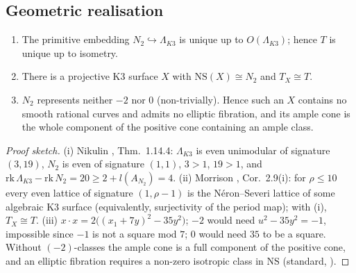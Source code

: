 \subsection{Geometric realisation}\label{sec:rev8geom}
\begin{theorem}\label{thm:K3exist8}
\begin{enumerate}[label=(\roman*)]
\item The primitive embedding $N_2\hookrightarrow\Lambda_{K3}$ is unique up to $O(\Lambda_{K3})$; hence $T$ is unique up to isometry.
\item There is a projective K3 surface $X$ with $\mathrm{NS}(X)\cong N_2$ and $T_X\cong T$.
\item $N_2$ represents neither $-2$ nor $0$ (non-trivially). Hence such an $X$ contains no smooth rational curves and admits no elliptic fibration, and its ample cone is the whole component of the positive cone containing an ample class.
\end{enumerate}
\end{theorem}
\begin{proof}[Proof sketch]
(i) Nikulin \cite{Nikulin}, Thm.~1.14.4: $\Lambda_{K3}$ is even unimodular of signature $(3,19)$, $N_2$ is even of signature $(1,1)$, $3>1$, $19>1$, and $\mathrm{rk}\,\Lambda_{K3}-\mathrm{rk}\,N_2=20\ge2+l(A_{N_2})=4$. (ii) Morrison \cite{Morrison}, Cor.~2.9(i): for $\rho\le10$ every even lattice of signature $(1,\rho-1)$ is the N\'eron--Severi lattice of some algebraic K3 surface (equivalently, surjectivity of the period map); with (i), $T_X\cong T$. (iii) $x\cdot x=2\big((x_1+7y)^2-35y^2\big)$; $-2$ would need $u^2-35y^2=-1$, impossible since $-1$ is not a square mod $7$; $0$ would need $35$ to be a square. Without $(-2)$-classes the ample cone is a full component of the positive cone, and an elliptic fibration requires a non-zero isotropic class in $\mathrm{NS}$ (standard, \cite{Huybrechts}).
\end{proof}

